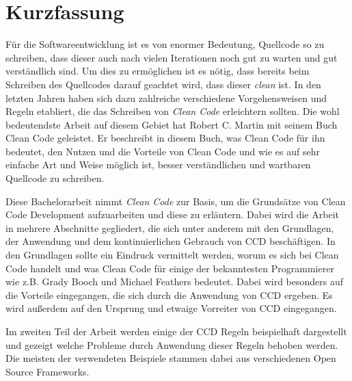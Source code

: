 \chapter{Kurzfassung}

Für die Softwareentwicklung ist es von enormer Bedeutung, Quellcode so zu schreiben, dass dieser auch nach vielen Iterationen noch gut zu warten und gut verständlich sind. Um dies zu ermöglichen ist es nötig, dass bereits beim Schreiben des Quellcodes darauf geachtet wird, dass dieser \textit{clean} ist. In den letzten Jahren haben sich dazu zahlreiche verschiedene Vorgehensweisen und Regeln etabliert, die das Schreiben von \textit{Clean Code} erleichtern sollten. Die wohl bedeutendste Arbeit auf diesem Gebiet hat Robert C. Martin mit seinem Buch Clean Code geleistet. Er beschreibt in diesem Buch, was Clean Code für ihn bedeutet, den Nutzen und die Vorteile von Clean Code und wie es auf sehr einfache Art und Weise möglich ist, besser verständlichen und wartbaren Quellcode zu schreiben.

Diese Bachelorarbeit nimmt \textit{Clean Code} zur Basis, um die Grundsätze von Clean Code Development aufzuarbeiten und diese zu erläutern. Dabei wird die Arbeit in mehrere Abschnitte gegliedert, die sich unter anderem mit den Grundlagen, der Anwendung und dem kontinuierlichen Gebrauch von CCD beschäftigen. In den Grundlagen sollte ein Eindruck vermittelt werden, worum es sich bei Clean Code handelt und was Clean Code für einige der bekanntesten Programmierer wie z.B. Grady Booch und Michael Feathers bedeutet. Dabei wird besonders auf die Vorteile eingegangen, die sich durch die Anwendung von CCD ergeben. Es wird außerdem auf den Ursprung und etwaige Vorreiter von CCD eingegangen.

Im zweiten Teil der Arbeit werden einige der CCD Regeln beispielhaft dargestellt und gezeigt welche Probleme durch Anwendung dieser Regeln behoben werden. Die meisten der verwendeten Beispiele stammen dabei aus verschiedenen Open Source Frameworks.